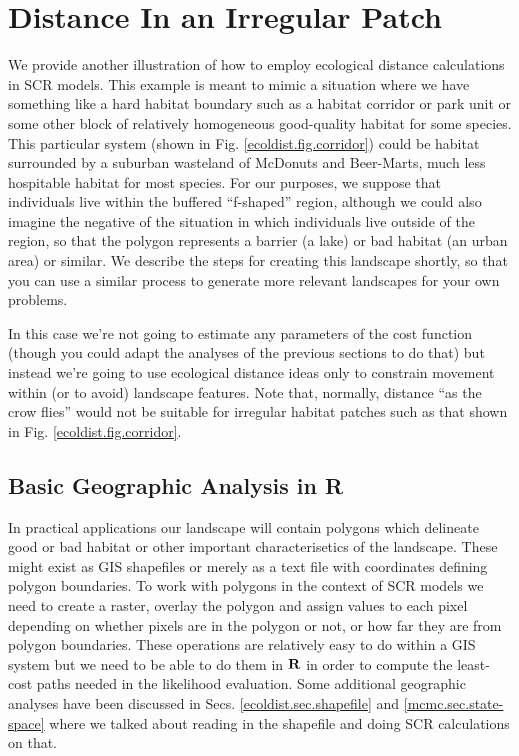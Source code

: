 \section{Distance In an Irregular Patch}
\label{ecoldist.sec.buffer}

We provide another illustration of how to employ ecological distance
calculations in SCR models. This example is meant to mimic
a situation where we have something like a hard habitat boundary
such as a habitat corridor or park unit or some other block
of relatively homogeneous good-quality habitat for some species. This
particular system (shown in Fig. \ref{ecoldist.fig.corridor}) could
be habitat surrounded by a suburban wasteland of McDonuts and
Beer-Marts, much less hospitable habitat for most species.  For our
purposes, we suppose that individuals live within the buffered
``f-shaped''
region, although we could also imagine the negative of the
situation in which individuals live outside of the region, so that the
polygon represents a barrier (a lake) or bad habitat (an urban area)
or similar.  We describe the steps for creating this landscape
shortly, so that you can use a similar process to generate more
relevant landscapes for your own problems.

In this case we're not going to estimate any parameters of the cost
function (though you could adapt the analyses of the previous sections
to do that) but instead we're going to use ecological
distance ideas only to constrain movement within (or to avoid)
landscape features. Note that, normally, distance ``as the crow
flies'' would not be suitable for irregular habitat patches such as
that shown in Fig. \ref{ecoldist.fig.corridor}.


\subsection{Basic Geographic Analysis in R}

In practical applications our landscape will contain %
polygons which delineate good or bad habitat or other important
characterisetics of the landscape.  These might exist as GIS
shapefiles or merely as a text file with coordinates defining polygon
boundaries. To work with polygons in the context of SCR models we need
to create a raster, overlay the polygon and assign values to each pixel
depending on whether pixels are in the polygon or not, or how far they
are from polygon boundaries. These operations are relatively easy to
do within a GIS system but we need to be able to do them in ${\bf R}$
in order to compute the least-cost paths needed in the likelihood
evaluation. Some additional geographic analyses have been discussed in
Secs. \ref{ecoldist.sec.shapefile} and \ref{mcmc.sec.state-space}
where we talked about reading in the shapefile and doing SCR calculations
on that.

